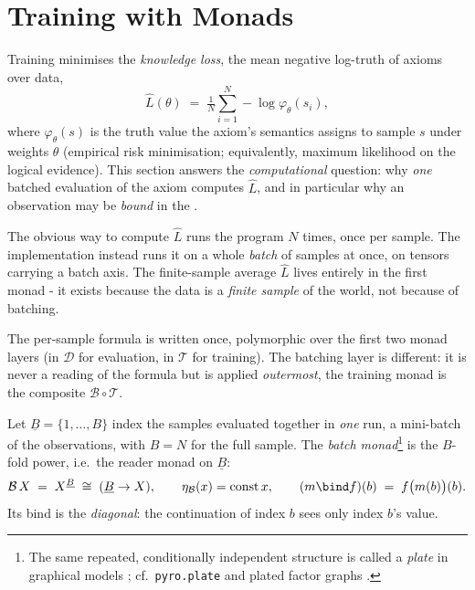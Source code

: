 \documentclass[anon]{../../journal-templates/NeSy26/nesy2026} %
\begin{document}
\section{Training with Monads}
\label{sec:training}

Training minimises the \emph{knowledge loss}, the mean negative log-truth of axioms over data,
\[
  \widehat L(\theta) \;=\; \tfrac{1}{N}\sum_{i=1}^{N} -\log \varphi_\theta(s_i),
\]
where $\varphi_\theta(s)$ is the truth value the axiom's semantics assigns to sample $s$
under weights $\theta$ (empirical risk minimisation; equivalently, maximum likelihood on the logical
evidence). This section answers the \emph{computational} question: why \emph{one} batched evaluation
of the axiom computes $\widehat L$, and in particular why an observation may be \emph{bound} in the
\doNotation. 

The obvious
way to compute $\widehat{L}$ runs the \doNotation program $N$ times, once per sample. The
implementation instead runs it on a whole \emph{batch} of samples at once, on tensors
carrying a batch axis.
The finite-sample average $\widehat L$ lives entirely in the first monad - it
exists because the data is a \emph{finite sample} of the world, not because of batching.

The per-sample formula is written once, polymorphic over the first two monad layers (in
$\mathcal D$ for evaluation, in $\mathcal{T}$ for training). The batching layer
is different: it is never a reading of the formula but is applied \emph{outermost}, the training monad is the composite
$\mathcal B \circ \mathcal{T}$.

\begin{definition}
Let $\underline B = \{1,\dots,B\}$ index the samples evaluated together in \emph{one} run, a
mini-batch of the observations, with $B = N$ for the full sample. The \emph{batch monad}\footnote{The same repeated, conditionally independent structure is called a \emph{plate} in graphical models \citep{buntine1994operations}; cf.\ \texttt{pyro.plate} \citep{bingham2019pyro} and plated factor graphs \citep{obermeyer2019tensor}.} is the
$B$-fold power, i.e.\ the reader monad on $\underline B$:
\[
  \mathcal B\,X \;=\; X^{\underline B} \;\cong\; (\underline B \to X), \qquad
  \eta_{\mathcal B}(x) = \mathrm{const}\,x, \qquad
  (m \bind f)(b) \;=\; f\bigl(m(b)\bigr)(b).
\]
Its bind is the \emph{diagonal}: the continuation of index $b$ sees only index $b$'s value.
\end{definition}
\end{document}
